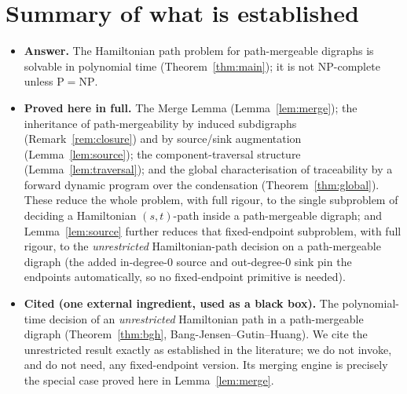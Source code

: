 \documentclass[12pt]{article}
\theoremstyle{definition}
\begin{document}
\section*{Summary of what is established}

\begin{itemize}
\item \textbf{Answer.} The Hamiltonian path problem for path-mergeable digraphs is
solvable in polynomial time (Theorem~\ref{thm:main}); it is not NP-complete unless
$\mathrm{P}=\mathrm{NP}$.
\item \textbf{Proved here in full.} The Merge Lemma (Lemma~\ref{lem:merge}); the
inheritance of path-mergeability by induced subdigraphs (Remark~\ref{rem:closure})
and by source/sink augmentation (Lemma~\ref{lem:source}); the component-traversal
structure (Lemma~\ref{lem:traversal}); and the global characterisation of
traceability by a forward dynamic program over the condensation
(Theorem~\ref{thm:global}). These reduce the whole problem, with full rigour, to
the single subproblem of deciding a Hamiltonian $(s,t)$-path inside a
path-mergeable digraph; and Lemma~\ref{lem:source} further reduces that
fixed-endpoint subproblem, with full rigour, to the \emph{unrestricted}
Hamiltonian-path decision on a path-mergeable digraph (the added in-degree-$0$
source and out-degree-$0$ sink pin the endpoints automatically, so no
fixed-endpoint primitive is needed).
\item \textbf{Cited (one external ingredient, used as a black box).} The
polynomial-time decision of an \emph{unrestricted} Hamiltonian path in a
path-mergeable digraph (Theorem~\ref{thm:bgh}, Bang-Jensen--Gutin--Huang). We cite
the unrestricted result exactly as established in the literature; we do not invoke,
and do not need, any fixed-endpoint version. Its merging engine is precisely the
special case proved here in Lemma~\ref{lem:merge}.
\end{itemize}
\end{document}
